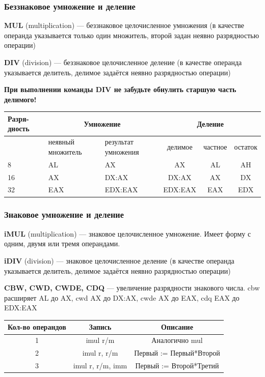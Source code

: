 \documentclass[utf8, russian]{beamer}
\begin{document}
    \begin{frame}[fragile]
        \frametitle{Беззнаковое умножение и деление}
        {\bf MUL } (multiplication) --- беззнаковое целочисленное умножения (в качестве операнда указывается только один множитель, второй задан неявно разрядностью операции)

        {\bf DIV } (division) --- беззнаковое целочисленное деление (в качестве операнда указывается делитель, делимое задаётся неявно разрядностью операции)

        {\bf При выполнении команды DIV не забудьте обнулить старшую часть делимого!}


        \begin{table}\small
            \begin{tabular}{|p{1cm}|p{2cm}|p{2cm}||c|c|c|}
                \hline Разря-дность & \multicolumn{2}{|c||}{Умножение} & \multicolumn{3}{|c|}{Деление} \\
                \hline  & неявный \newline множитель & результат \newline умножения & делимое & частное & остаток \\
                \hline 8 & AL & AX &  AX & AL & AH \\
                \hline 16 & AX & DX:AX & DX:AX & AX & DX \\
                \hline 32 & EAX & EDX:EAX & EDX:EAX & EAX & EDX \\
                \hline
            \end{tabular}
        \end{table}
\end{frame}
    \begin{frame}[fragile]
        \frametitle{Знаковое умножение и деление}
        {\bf iMUL } (multiplication) --- знаковое целочисленное умножение. Имеет форму с одним, двумя или тремя операндами.

        {\bf iDIV } (division) --- знаковое целочисленное деление (в качестве операнда указывается делитель, делимое задаётся неявно разрядностью операции)

        {\bf CBW, CWD, CWDE, CDQ} --- увеличение разрядности знакового числа. cbw расширяет AL до AX, cwd AX до DX:AX, cwde AX до EAX, cdq EAX до EDX:EAX
        \begin{table}\small
            \begin{tabular}{|c|c|c|}
                \hline Кол-во операндов & Запись & Описание \\
                \hline 1 & imul r/m & Аналогично mul \\
                \hline 2 & imul r, r/m & Первый := Первый*Второй \\
                \hline 3 & imul r, r/m, imm & Первый := Второй*Третий \\
                \hline
            \end{tabular}
        \end{table}
\end{frame}
\end{document}
